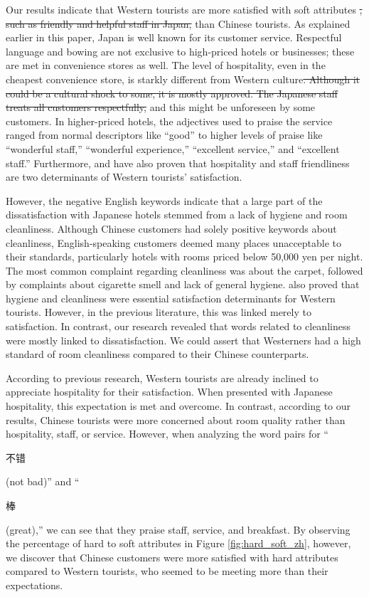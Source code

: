 \documentclass[smallextended,natbib]{svjour3}       %
\providecommand{\DIFadd}[1]{{\protect\color{blue}\uwave{#1}}} %
\providecommand{\DIFdel}[1]{{\protect\color{red}\sout{#1}}}                      %
\providecommand{\DIFaddbegin}{} %
\providecommand{\DIFaddend}{} %
\providecommand{\DIFdelbegin}{} %
\providecommand{\DIFdelend}{} %
\newcommand{\DIFscaledelfig}{0.5}
\newlength{\DIFdelgraphicswidth} %
\newlength{\DIFdelgraphicsheight} %
\newcommand{\DIFaddincludegraphics}[2][]{{\color{blue}\fbox{\DIFOincludegraphics[#1]{#2}}}} %
\newcommand{\DIFdelincludegraphics}[2][]{%
\sbox{\DIFdelgraphicsbox}{\DIFOincludegraphics[#1]{#2}}%
\settoboxwidth{\DIFdelgraphicswidth}{\DIFdelgraphicsbox} %
\settoboxtotalheight{\DIFdelgraphicsheight}{\DIFdelgraphicsbox} %
\scalebox{\DIFscaledelfig}{%
\parbox[b]{\DIFdelgraphicswidth}{\usebox{\DIFdelgraphicsbox}\\[-\baselineskip] \rule{\DIFdelgraphicswidth}{0em}}\llap{\resizebox{\DIFdelgraphicswidth}{\DIFdelgraphicsheight}{%
\setlength{\unitlength}{\DIFdelgraphicswidth}%
\begin{picture}(1,1)%
\thicklines\linethickness{2pt} %
{\color[rgb]{1,0,0}\put(0,0){\framebox(1,1){}}}%
{\color[rgb]{1,0,0}\put(0,0){\line( 1,1){1}}}%
{\color[rgb]{1,0,0}\put(0,1){\line(1,-1){1}}}%
\end{picture}%
}\hspace*{3pt}}} %
} %
\DeclareRobustCommand{\DIFaddbegin}{\DIFOaddbegin \let\includegraphics\DIFaddincludegraphics} %
\DeclareRobustCommand{\DIFaddend}{\DIFOaddend \let\includegraphics\DIFOincludegraphics} %
\DeclareRobustCommand{\DIFdelbegin}{\DIFOdelbegin \let\includegraphics\DIFdelincludegraphics} %
\DeclareRobustCommand{\DIFdelend}{\DIFOaddend \let\includegraphics\DIFOincludegraphics} %
\begin{document}
    Our results indicate that Western tourists are more satisfied with soft attributes \DIFdelbegin \DIFdel{, such as friendly and helpful staff in Japan, }\DIFdelend than Chinese tourists. As explained earlier in this paper, Japan is well known for its customer service. Respectful language and bowing are not exclusive to high-priced hotels or businesses; these are met in convenience stores as well. The level of hospitality, even in the cheapest convenience store, is starkly different from Western culture\DIFdelbegin \DIFdel{. Although it could be a cultural shock to some, it is mostly approved. The Japanese staff treats all customers respectfully, }\DIFdelend \DIFaddbegin \DIFadd{, }\DIFaddend and this might be unforeseen by some customers. In higher-priced hotels, the adjectives used to praise the service ranged from normal descriptors like ``good'' to higher levels of praise like ``wonderful staff,'' ``wonderful experience,'' ``excellent service,'' and ``excellent staff.'' Furthermore, \cite{kozak2002} and \cite{shanka2004} have also proven that hospitality and staff friendliness are two determinants of Western tourists' satisfaction.

    However, the negative English keywords indicate that a large part of the dissatisfaction with Japanese hotels stemmed from a lack of hygiene and room cleanliness. Although Chinese customers had solely positive keywords about cleanliness, English-speaking customers deemed many places unacceptable to their standards, particularly hotels with rooms priced below 50,000 yen per night. The most common complaint regarding cleanliness was about the carpet, followed by complaints about cigarette smell and lack of general hygiene. \cite{kozak2002} also proved that hygiene and cleanliness were essential satisfaction determinants for Western tourists. However, in the previous literature, this was linked merely to satisfaction. In contrast, our research revealed that words related to cleanliness were mostly linked to dissatisfaction. We could assert that Westerners had a high standard of room cleanliness compared to their Chinese counterparts.

    According to previous research, Western tourists are already inclined to appreciate hospitality for their satisfaction. When presented with Japanese hospitality, this expectation is met and overcome. In contrast, according to our results, Chinese tourists were more concerned about room quality rather than hospitality, staff, or service. However, when analyzing the word pairs for ``\begin{CJK}{UTF8}{gbsn}不错\end{CJK} (not bad)'' and ``\begin{CJK}{UTF8}{gbsn}棒\end{CJK} (great),'' we can see that they praise staff, service, and breakfast. By observing the percentage of hard to soft attributes in Figure \ref{fig:hard_soft_zh}, however, we discover that Chinese customers were more satisfied with hard attributes compared to Western tourists, who seemed to be meeting more than their expectations.
\end{document}
